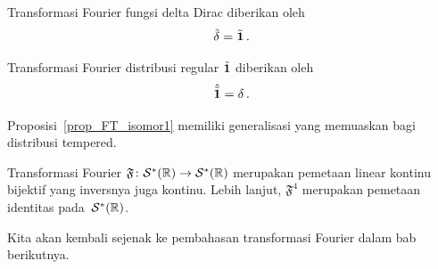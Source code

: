 \begin{exam} Transformasi Fourier fungsi delta Dirac diberikan oleh
   \[ \hat\delta = \tilde{\mathbf{1}}\,. \]
\end{exam}

\begin{exam} Transformasi Fourier distribusi regular $\tilde{\mathbf{1}}$ diberikan oleh
   \[ \hat{\tilde{\mathbf{1}}} = \delta\,. \]
\end{exam}

Proposisi~\ref{prop_FT_isomor1} memiliki generalisasi yang memuaskan bagi distribusi tempered.

\begin{prop} Transformasi Fourier $\mathfrak F\colon \mathcal{S}^*(\mathbb{R}) \rightarrow \mathcal{S}^*(\mathbb{R})$ merupakan pemetaan linear kontinu
bijektif yang inversnya juga kontinu. Lebih lanjut, $\mathfrak F^4$ merupakan pemetaan identitas pada~$\mathcal{S}^*(\mathbb{R})$.
\end{prop}

Kita akan kembali sejenak ke pembahasan transformasi Fourier dalam bab berikutnya.
















\endinput
